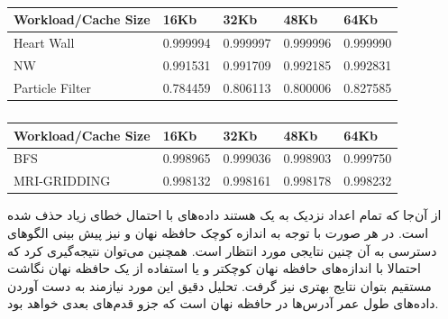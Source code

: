 \documentclass{thesis}
\begin{document}
\begin{center}
\begin{table}[h!]
\begin{latin}
\begin{tabular}{|p{}|p{}|p{}|p{}|p{}|}
\hline
Workload/Cache Size & 16Kb  & 32Kb  & 48Kb  & 64Kb \\
\hline
Heart Wall          & 0.999994 & 0.999997 & 0.999996 & 0.999990 \\
\hline
NW                  & 0.991531 & 0.991709 & 0.992185 & 0.992831 \\
\hline
Particle Filter     & 0.784459 & 0.806113 & 0.800006 & 0.827585 \\
\hline
\end{tabular}
\end{latin}
\caption{%
}
\label{table:parboilhitrate}
\end{table}
\end{center}

\begin{center}
\begin{table}[h!]
\begin{latin}
\begin{tabular}{|p{}|p{}|p{}|p{}|p{}|}
\hline
Workload/Cache Size & 16Kb  & 32Kb  & 48Kb  & 64Kb \\
\hline
BFS                 & 0.998965 & 0.999036 & 0.998903 & 0.999750 \\
\hline
MRI-GRIDDING        & 0.998132 & 0.998161 & 0.998178 & 0.998232 \\
\hline
\end{tabular}
\end{latin}
\caption{%
}
\label{table:parboilhitrate}
\end{table}
\end{center}

از آن‌جا که تمام اعداد نزدیک به یک هستند داده‌های با احتمال خطای زیاد حذف شده است. در هر صورت با توجه به اندازه کوچک حافظه نهان و نیز پیش بینی الگو‌های دسترسی به آن چنین نتایجی مورد انتظار است. همچنین می‌توان نتیجه‌گیری کرد که احتمالا با اندازه‌های حافظه نهان کوچکتر و یا استفاده از یک حافظه نهان نگاشت
 مستقیم بتوان نتایج بهتری نیز گرفت. تحلیل دقیق این مورد نیازمند به دست آوردن داده‌های طول عمر آدرس‌ها در حافظه نهان است که جزو قدم‌های بعدی خواهد بود.
 
\end{document}
